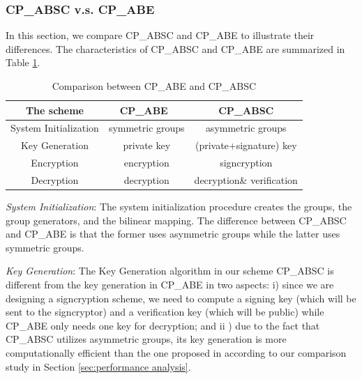 \documentclass[letterpaper,12pt]{article}
\begin{document}
\subsubsection{CP\_ABSC v.s. CP\_ABE}

In this section, we compare CP\_ABSC and CP\_ABE\cite{bethencourt2007ciphertext} to illustrate their differences. The characteristics of CP\_ABSC and CP\_ABE are summarized in Table \ref{table:comparison between CP-ABE and our scheme}.



\begin{table}[tb]
\caption{Comparison  between CP\_ABE and CP\_ABSC}\label{table:comparison between CP-ABE and our scheme}
\centering
\begin{tabular}{c| c| c}
\hline
The scheme&  CP\_ABE~\cite{bethencourt2007ciphertext} & CP\_ABSC  \\
\hline
System Initialization & symmetric groups & asymmetric groups \\
Key Generation & private key  & (private+signature) key \\
Encryption & encryption& signcryption\\
Decryption & decryption& decryption\& verification\\
\hline
\end{tabular}
\end{table}

\emph{ System Initialization}: The system initialization procedure creates the groups, the group generators, and the bilinear mapping. The difference between CP\_ABSC and CP\_ABE is that the former uses asymmetric groups while the latter uses symmetric groups.

\emph{Key Generation}: The Key Generation algorithm in our scheme CP\_ABSC is different from the key generation in CP\_ABE \cite{bethencourt2007ciphertext} in two aspects: i) since we are designing a signcryption scheme, we need to compute a signing key (which will be sent to the signcryptor) and a verification key (which will be public) while CP\_ABE only needs one key for decryption; and ii ) due to the fact that CP\_ABSC utilizes asymmetric groups, its key generation is more computationally efficient than the one proposed in \cite{bethencourt2007ciphertext} according to our comparison study in Section \ref{sec:performance analysis}.
\end{document}
